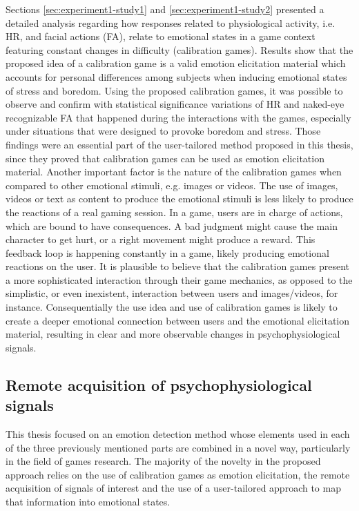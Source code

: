 Sections \ref{sec:experiment1-study1} and \ref{sec:experiment1-study2} presented a detailed analysis regarding how responses related to physiological activity, i.e. HR, and facial actions (FA), relate to emotional states in a game context featuring constant changes in difficulty (calibration games). Results show that the proposed idea of a calibration game is a valid emotion elicitation material which accounts for personal differences among subjects when inducing emotional states of stress and boredom. Using the proposed calibration games, it was possible to observe and confirm with statistical significance variations of HR and naked-eye recognizable FA that happened during the interactions with the games, especially under situations that were designed to provoke boredom and stress. Those findings were an essential part of the user-tailored method proposed in this thesis, since they proved that calibration games can be used as emotion elicitation material. Another important factor is the nature of the calibration games when compared to other emotional stimuli, e.g. images or videos. The use of images, videos or text as content to produce the emotional stimuli is less likely to produce the reactions of a real gaming session. In a game, users are in charge of actions, which are bound to have consequences. A bad judgment might cause the main character to get hurt, or a right movement might produce a reward. This feedback loop is happening constantly in a game, likely producing emotional reactions on the user. It is plausible to believe that the calibration games present a more sophisticated interaction through their game mechanics, as opposed to the simplistic, or even inexistent, interaction between users and images/videos, for instance. Consequentially the use idea and use of calibration games is likely to create a deeper emotional connection between users and the emotional elicitation material, resulting in clear and more observable changes in psychophysiological signals.

\subsection{Remote acquisition of psychophysiological signals}

This thesis focused on an emotion detection method whose elements used in each of the three previously mentioned parts are combined in a novel way, particularly in the field of games research. The majority of the novelty in the proposed approach relies on the use of calibration games as emotion elicitation, the remote acquisition of signals of interest and the use of a user-tailored approach to map that information into emotional states.

